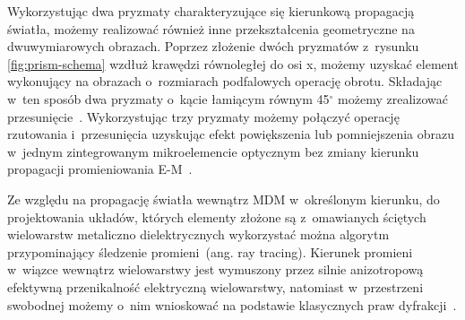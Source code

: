 Wykorzystując dwa pryzmaty charakteryzujące się kierunkową propagacją światła, możemy realizować również inne przekształcenia geometryczne na dwuwymiarowych obrazach. Poprzez złożenie dwóch pryzmatów z~rysunku \ref{fig:prism-schema} wzdłuż krawędzi równoległej do osi x, możemy uzyskać element wykonujący na obrazach o~rozmiarach podfalowych operację obrotu. Składając w~ten sposób dwa pryzmaty o~kącie łamiącym równym 45$^\circ$ możemy zrealizować przesunięcie~\cite{Zhao:08,barros2016two}. Wykorzystując trzy pryzmaty możemy połączyć operację rzutowania i~przesunięcia uzyskując efekt powiększenia lub pomniejszenia obrazu w~jednym zintegrowanym mikroelemencie optycznym bez zmiany kierunku propagacji promieniowania E-M~\cite{Zhao:08}.

Ze względu na propagację światła wewnątrz MDM w~określonym kierunku, do projektowania układów, których elementy złożone są z~omawianych ściętych wielowarstw metaliczno dielektrycznych wykorzystać można algorytm przypominający śledzenie promieni~(ang. ray tracing). Kierunek promieni w~wiązce wewnątrz wielowarstwy jest wymuszony  przez silnie anizotropową efektywną przenikalność elektryczną wielowarstwy, natomiast w~przestrzeni swobodnej możemy o~nim wnioskować na podstawie klasycznych praw dyfrakcji~\cite{pastuszczak2011slanted}.

